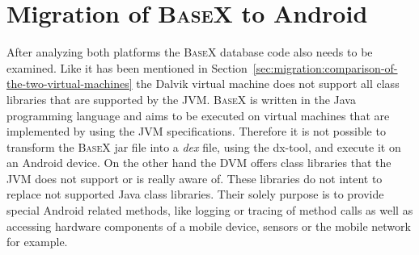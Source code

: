 \section{Migration of \textsc{BaseX} to Android}
\label{sec:migration:migration-of-basex-to-android}
After analyzing both platforms the \textsc{BaseX} database code also needs to be examined.
Like it has been mentioned in Section~\ref{sec:migration:comparison-of-the-two-virtual-machines} the Dalvik virtual machine does not support all class libraries that are supported by the JVM.
\textsc{BaseX} is written in the Java programming language and aims to be executed on virtual machines that are implemented by using the JVM specifications.
Therefore it is not possible to transform the \textsc{BaseX} jar file into a \textit{dex} file, using the dx-tool, and execute it on an Android device.
On the other hand the DVM offers class libraries that the JVM does not support or is really aware of.
These libraries do not intent to replace not supported Java class libraries.
Their solely purpose is to provide special Android related methods, like logging or tracing of method calls as well as accessing hardware components of a mobile device, sensors or the mobile network for example. 

